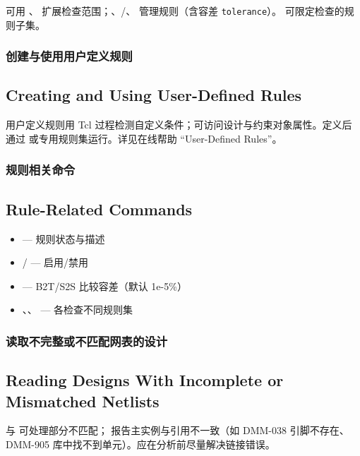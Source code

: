 可用 、 扩展检查范围；、/、 管理规则（含容差 \texttt{tolerance}）。 可限定检查的规则子集。

\subsubsection{创建与使用用户定义规则}
\subsection*{Creating and Using User-Defined Rules}

用户定义规则用 Tcl 过程检测自定义条件；可访问设计与约束对象属性。定义后通过  或专用规则集运行。详见在线帮助 “User-Defined Rules”。

\subsubsection{规则相关命令}
\subsection*{Rule-Related Commands}

\begin{itemize}
  \item {} — 规则状态与描述
  \item {}/ — 启用/禁用
  \item {} — B2T/S2S 比较容差（默认 1e-5\%）
  \item {}、、 — 各检查不同规则集
\end{itemize}

\subsubsection{读取不完整或不匹配网表的设计}
\subsection*{Reading Designs With Incomplete or Mismatched Netlists}

 与  可处理部分不匹配； 报告主实例与引用不一致（如 DMM-038 引脚不存在、DMM-905 库中找不到单元）。应在分析前尽量解决链接错误。

